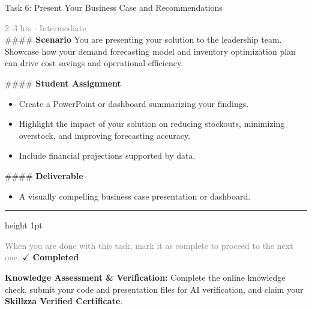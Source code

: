 \documentclass[10pt,a4paper]{article}
\begin{document}
\begin{taskbox}{Task 6: Present Your Business Case and Recommendations}

    {\small \textcolor{gray}{2--3 hrs $\cdot$ Intermediate}}\\[12pt]

    \#\#\#\# \textbf{Scenario}  
You are presenting your solution to the leadership team. Showcase how your demand forecasting model and inventory optimization plan can drive cost savings and operational efficiency.

\#\#\#\# \textbf{Student Assignment}  
\begin{itemize}
    \item Create a PowerPoint or dashboard summarizing your findings.  
    \item Highlight the impact of your solution on reducing stockouts, minimizing overstock, and improving forecasting accuracy.  
    \item Include financial projections supported by data.  
\end{itemize}

\#\#\#\# \textbf{Deliverable}  
\begin{itemize}
    \item A visually compelling business case presentation or dashboard.\par
\end{itemize}

    \vspace{16pt}

    \textcolor{cardBorder}{\hrule height 1pt}\vspace{8pt}

    \small \textcolor{gray}{When you are done with this task, mark it as complete to proceed to the next one.} \hfill \textbf{\textcolor{brandDark}{$\checkmark$ Completed}}

\end{taskbox}

\begin{completionbox}
    \textbf{Knowledge Assessment \& Verification:} Complete the online knowledge check, submit your code and presentation files for AI verification, and claim your \textbf{Skillzza Verified Certificate}.
\end{completionbox}

\newpage


\end{document}
